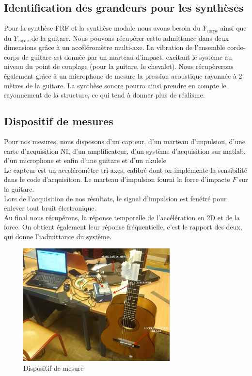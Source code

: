 \subsection*{Identification des grandeurs pour les synthèses}

Pour la synthèse FRF et la synthèse modale nous avons besoin du
$Y_{\text{corps}}$ ainsi que du $Y_{\text{corde}}$ de la guitare. Nous pouvons
récupérer cette admittance dans deux dimensions grâce à un accéléromètre
multi-axe. La vibration de l'ensemble corde-corps de guitare est donnée par un
marteau d'impact, excitant le système au niveau du point de couplage (pour la
guitare, le chevalet). Nous récupèrerons également grâce à un microphone de
mesure la pression acoustique rayonnée à 2 mètres de la guitare. La synthèse
sonore pourra ainsi prendre en compte le rayonnement de la structure, ce qui
tend à donner plus de réalisme.

\subsection*{Dispositif de mesures}

Pour nos mesures, nous disposons d'un capteur, d'un marteau d'impulsion, d'une
carte d'acquisition NI, d'un amplificateur, d'un système d'acquisition sur
matlab, d'un microphone et enfin d'une guitare et d'un ukulele \\

Le capteur est un acceléromètre tri-axes, calibré dont on implémente la
sensibilité dans le code d'acquisition. Le marteau d'impulsion fourni la force
d'impacte $F$ sur la guitare. \\ Lors de l'acquisition de nos résultats, le
signal d'impulsion est fenétré pour enlever tout bruit électronique. \\ Au
final nous récupérons, la réponse temporelle de l'accélération en 2D et de la
force. On obtient également leur réponse fréquentielle, c'est le rapport des
deux, qui donne l'iadmittance du système.

\begin{figure}[h]
\centering
\includegraphics[width = 8cm]{figures/dispo.JPG}
\caption{Dispositif de mesure}
\end{figure}


